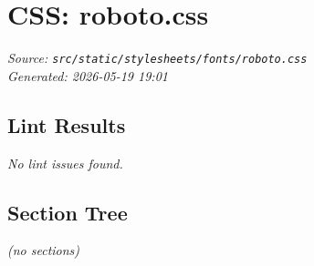 
\section*{CSS: roboto.css}
\textit{Source: \texttt{src/static/stylesheets/fonts/roboto.css}} \\
\textit{Generated: 2026-05-19 19:01} \\[0.5em]

\subsection*{Lint Results}
\textit{No lint issues found.} \\

\subsection*{Section Tree}

\noindent
\textit{(no sections)}

